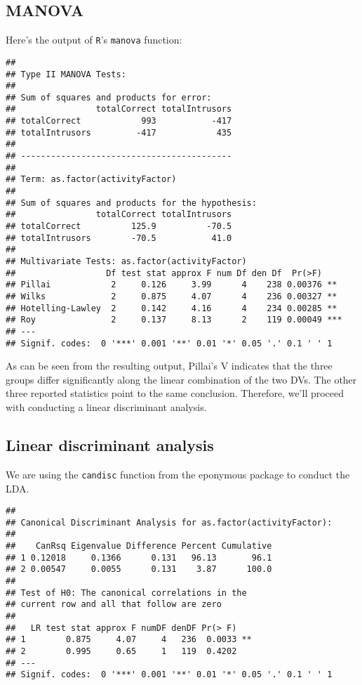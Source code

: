 \documentclass[11pt,]{article}
\begin{document}
\hypertarget{manova}{%
\subsection{MANOVA}\label{manova}}

Here's the output of \texttt{R}'s \texttt{manova} function:

\begin{verbatim}
## 
## Type II MANOVA Tests:
## 
## Sum of squares and products for error:
##                totalCorrect totalIntrusors
## totalCorrect            993           -417
## totalIntrusors         -417            435
## 
## ------------------------------------------
##  
## Term: as.factor(activityFactor) 
## 
## Sum of squares and products for the hypothesis:
##                totalCorrect totalIntrusors
## totalCorrect          125.9          -70.5
## totalIntrusors        -70.5           41.0
## 
## Multivariate Tests: as.factor(activityFactor)
##                  Df test stat approx F num Df den Df  Pr(>F)    
## Pillai            2     0.126     3.99      4    238 0.00376 ** 
## Wilks             2     0.875     4.07      4    236 0.00327 ** 
## Hotelling-Lawley  2     0.142     4.16      4    234 0.00285 ** 
## Roy               2     0.137     8.13      2    119 0.00049 ***
## ---
## Signif. codes:  0 '***' 0.001 '**' 0.01 '*' 0.05 '.' 0.1 ' ' 1
\end{verbatim}

As can be seen from the resulting output, Pillai's V indicates that the
three groups differ significantly along the linear combination of the
two DVs. The other three reported statistics point to the same
conclusion. Therefore, we'll proceed with conducting a linear
discriminant analysis.

\hypertarget{linear-discriminant-analysis}{%
\subsection{Linear discriminant
analysis}\label{linear-discriminant-analysis}}

We are using the \texttt{candisc} function from the eponymous package
\citep{friendlyCandiscVisualizingGeneralized2017} to conduct the LDA.

\begin{verbatim}
## 
## Canonical Discriminant Analysis for as.factor(activityFactor):
## 
##    CanRsq Eigenvalue Difference Percent Cumulative
## 1 0.12018     0.1366      0.131   96.13       96.1
## 2 0.00547     0.0055      0.131    3.87      100.0
## 
## Test of H0: The canonical correlations in the 
## current row and all that follow are zero
## 
##   LR test stat approx F numDF denDF Pr(> F)   
## 1        0.875     4.07     4   236  0.0033 **
## 2        0.995     0.65     1   119  0.4202   
## ---
## Signif. codes:  0 '***' 0.001 '**' 0.01 '*' 0.05 '.' 0.1 ' ' 1
\end{verbatim}
\end{document}
